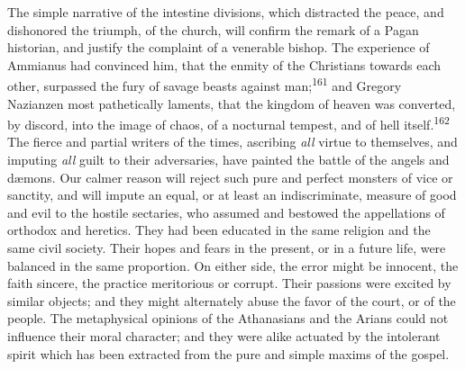 The simple narrative of the intestine divisions, which distracted
the peace, and dishonored the triumph, of the church, will
confirm the remark of a Pagan historian, and justify the
complaint of a venerable bishop. The experience of Ammianus had
convinced him, that the enmity of the Christians towards each
other, surpassed the fury of savage beasts against man;\textsuperscript{161} and
Gregory Nazianzen most pathetically laments, that the kingdom of
heaven was converted, by discord, into the image of chaos, of a
nocturnal tempest, and of hell itself.\textsuperscript{162} The fierce and partial
writers of the times, ascribing \textit{all} virtue to themselves, and
imputing \textit{all} guilt to their adversaries, have painted the
battle of the angels and dæmons. Our calmer reason will reject
such pure and perfect monsters of vice or sanctity, and will
impute an equal, or at least an indiscriminate, measure of good
and evil to the hostile sectaries, who assumed and bestowed the
appellations of orthodox and heretics. They had been educated in
the same religion and the same civil society. Their hopes and
fears in the present, or in a future life, were balanced in the
same proportion. On either side, the error might be innocent, the
faith sincere, the practice meritorious or corrupt. Their
passions were excited by similar objects; and they might
alternately abuse the favor of the court, or of the people. The
metaphysical opinions of the Athanasians and the Arians could not
influence their moral character; and they were alike actuated by
the intolerant spirit which has been extracted from the pure and
simple maxims of the gospel.



